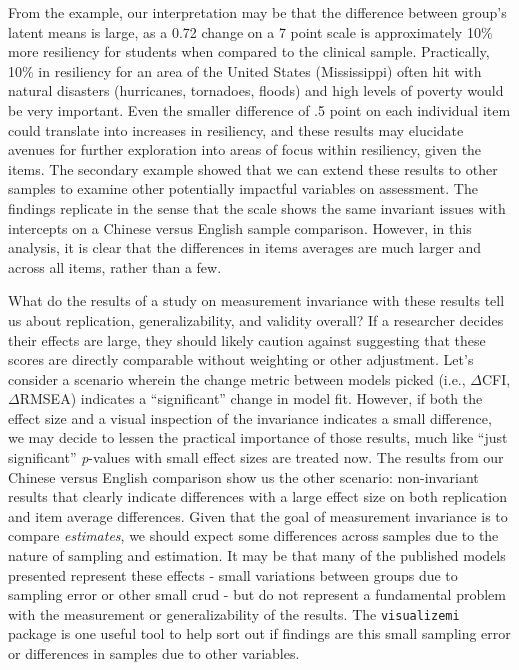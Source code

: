 \documentclass[
  man,floatsintext]{apa7}
\begin{document}
From the example, our interpretation may be that the difference between group's latent means is large, as a 0.72 change on a 7 point scale is approximately 10\% more resiliency for students when compared to the clinical sample. Practically, 10\% in resiliency for an area of the United States (Mississippi) often hit with natural disasters (hurricanes, tornadoes, floods) and high levels of poverty would be very important. Even the smaller difference of .5 point on each individual item could translate into increases in resiliency, and these results may elucidate avenues for further exploration into areas of focus within resiliency, given the items. The secondary example showed that we can extend these results to other samples to examine other potentially impactful variables on assessment. The findings replicate in the sense that the scale shows the same invariant issues with intercepts on a Chinese versus English sample comparison. However, in this analysis, it is clear that the differences in items averages are much larger and across all items, rather than a few.

What do the results of a study on measurement invariance with these results tell us about replication, generalizability, and validity overall? If a researcher decides their effects are large, they should likely caution against suggesting that these scores are directly comparable without weighting or other adjustment. Let's consider a scenario wherein the change metric between models picked (i.e., \(\Delta\)CFI, \(\Delta\)RMSEA) indicates a ``significant'' change in model fit. However, if both the effect size and a visual inspection of the invariance indicates a small difference, we may decide to lessen the practical importance of those results, much like ``just significant'' \emph{p}-values with small effect sizes are treated now. The results from our Chinese versus English comparison show us the other scenario: non-invariant results that clearly indicate differences with a large effect size on both replication and item average differences. Given that the goal of measurement invariance is to compare \emph{estimates}, we should expect some differences across samples due to the nature of sampling and estimation. It may be that many of the published models presented represent these effects - small variations between groups due to sampling error or other small crud - but do not represent a fundamental problem with the measurement or generalizability of the results. The \texttt{visualizemi} package is one useful tool to help sort out if findings are this small sampling error or differences in samples due to other variables.
\end{document}

